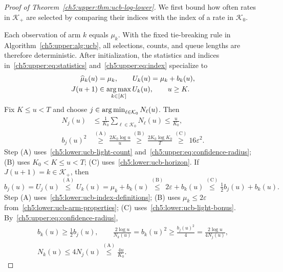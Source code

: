 \begin{proof}[Proof of Theorem~\ref{ch5:upper:thm:ucb-log-lower}]
We first bound how often rates in $\mathcal K_+$ are selected by comparing
their indices with the index of a rate in $\mathcal K_0$.

Each observation of arm $k$ equals $\mu_k$. With the fixed tie-breaking
rule in Algorithm~\ref{ch5:upper:alg:ucb}, all selections, counts, and queue
lengths are therefore deterministic. After initialization, the statistics and
indices in~\eqref{ch5:upper:eq:statistics} and~\eqref{ch5:upper:eq:index}
specialize to
\begin{equation}
\begin{aligned}
 \widehat\mu_k(u)&=\mu_k,\qquad U_k(u)=\mu_k+b_k(u),\\
 J(u+1)&\in\operatorname*{arg\,max}_{k\in[K]}U_k(u),\qquad u\ge K.
\end{aligned}
\label{ch5:lower:ucb-index-definitions}
\end{equation}
Fix $K\le u<T$ and choose $j\in\operatorname*{arg\,min}_{\ell\in\mathcal K_0}N_\ell(u)$.
Then
\begin{align}
 N_j(u)&\le\frac1{K_0}\sum_{\ell\in\mathcal K_0}N_\ell(u)\le\frac{u}{K_0},
 \label{ch5:lower:ucb-light-count}\\
b_j(u)^2
 &\overset{\mathrm{(A)}}{\ge}\frac{2K_0\log u}{u}
\overset{\mathrm{(B)}}{\ge}\frac{2K_0\log K_0}{T}
 \overset{\mathrm{(C)}}{\ge}16\varepsilon^2.
\label{ch5:lower:ucb-light-bonus}
\end{align}
Step (A) uses~\eqref{ch5:lower:ucb-light-count} and~\eqref{ch5:upper:eq:confidence-radius};
(B) uses $K_0<K\le u<T$; (C) uses~\eqref{ch5:lower:ucb-horizon}.
If $J(u+1)=k\in\mathcal K_+$, then
\begin{equation}
b_j(u)=U_j(u)\overset{\mathrm{(A)}}{\le} U_k(u)=\mu_k+b_k(u)
\overset{\mathrm{(B)}}{\le}2\varepsilon+b_k(u)
\overset{\mathrm{(C)}}{\le}\tfrac12b_j(u)+b_k(u).
\label{ch5:lower:ucb-index-comparison}
\end{equation}
Step (A) uses~\eqref{ch5:lower:ucb-index-definitions};
(B) uses $\mu_k\le2\varepsilon$ from~\eqref{ch5:lower:ucb-arm-properties};
(C) uses~\eqref{ch5:lower:ucb-light-bonus}. By~\eqref{ch5:upper:eq:confidence-radius},
\begin{equation}
\begin{gathered}
 b_k(u)\ge\tfrac12b_j(u),\qquad
 \frac{2\log u}{N_k(u)}=b_k(u)^2
 \ge\frac{b_j(u)^2}{4}=\frac{2\log u}{4N_j(u)},\\
 N_k(u)\le4N_j(u)
 \overset{\mathrm{(A)}}{\le}\frac{4u}{K_0}.
\end{gathered}
 \label{ch5:lower:ucb-relative-count}
\end{equation}

\end{proof}
